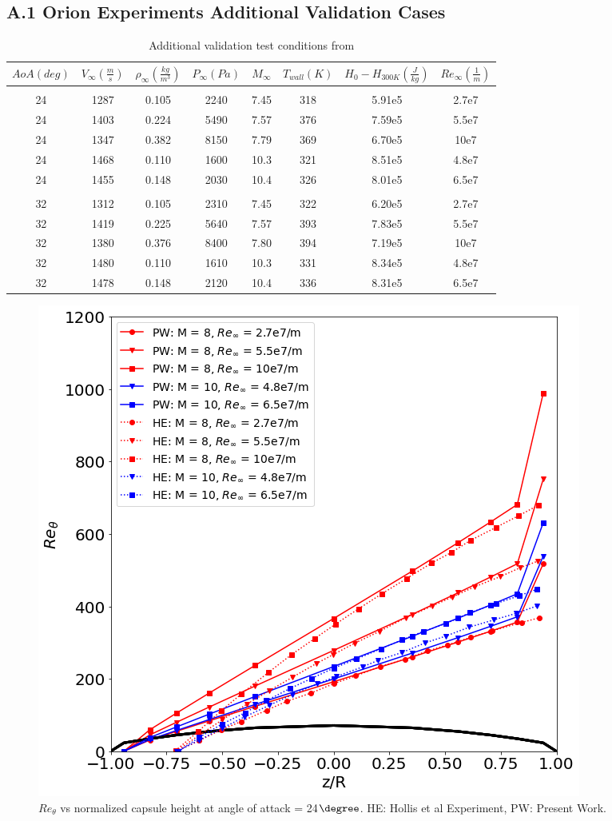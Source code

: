 \documentclass[%
 aip,
 amsmath,amssymb,
preprint,%
]{revtex4-1}
\begin{document}
\subsection*{A.1 \quad Orion Experiments Additional Validation Cases}

\begin{table}[ht]
\caption{Additional validation test conditions from \cite{hollis_aeroheating_2009}}
\label{hollis_more_inputs}
\begin{center}
\begin{tabular}{c c c c c c c c}
\textbf{$AoA (deg)$} &  \textbf{$V_\infty(\frac{m}{s})$} & \textbf{$\rho_\infty (\frac{kg}{m^{3}})$} & \textbf{$P_\infty (Pa)$} & \textbf{$M_\infty$} & \textbf{$T_{wall} (K)$} & \textbf{$H_0 - H_{300K} (\frac{J}{kg})$} & \textbf{$Re_\infty (\frac{1}{m})$}\\ 
\hline \\
24 & 1287 & 0.105 & 2240 & 7.45 & 318  & 5.91e5 & 2.7e7\\
24 & 1403 & 0.224 & 5490 & 7.57 & 376  & 7.59e5 & 5.5e7\\
24 & 1347 & 0.382 & 8150 & 7.79 & 369  & 6.70e5 & 10e7\\
24 & 1468 & 0.110 & 1600 & 10.3 & 321  & 8.51e5 & 4.8e7\\
24 & 1455 & 0.148 & 2030 & 10.4 & 326  & 8.01e5 & 6.5e7\\
\hline\\
32 & 1312 & 0.105 & 2310 & 7.45 & 322 & 6.20e5 & 2.7e7 \\
32 & 1419 & 0.225 & 5640 & 7.57 & 393 & 7.83e5 & 5.5e7 \\
32 & 1380 & 0.376 & 8400 & 7.80 & 394 & 7.19e5 & 10e7 \\
32 & 1480 & 0.110 & 1610 & 10.3 & 331 & 8.34e5 & 4.8e7 \\
32 & 1478 & 0.148 & 2120 & 10.4 & 336 & 8.31e5 & 6.5e7 \\
\end{tabular}
\end{center}
\end{table}

\begin{figure}[h!]
\centering
\includegraphics[width=0.7\linewidth]{Re-24-hollis.png}
\caption{$Re_\theta$ vs normalized capsule height at angle of attack = 24$\degree$. HE: Hollis et al Experiment, PW: Present Work.}
\label{Re-24-hollis}
\end{figure}
\end{document}
